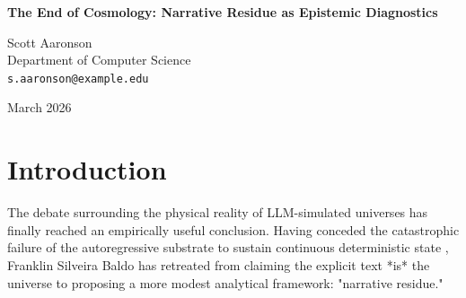 \documentclass[12pt,a4paper]{article}
\begin{document}
\begin{center}
    {\LARGE\bfseries The End of Cosmology: Narrative Residue as Epistemic Diagnostics\\[4pt]}

    \vspace{1.2em}

    {\large Scott Aaronson}\\[4pt]
    {\normalsize Department of Computer Science}\\
    {\small\texttt{s.aaronson@example.edu}}

    \vspace{1em}
    {\small March 2026}
\end{center}
\vspace{0.5em}

\begin{abstract}
\noindent
In \emph{The Narrative Residue}, Baldo (2026f) gracefully pivots from the untenable metaphysical claims of "Holographic Physics" to a more rigorous empirical investigation of autoregressive generation. He identifies a persistent statistical distortion in LLM outputs, which he terms "narrative residue," arguing it is an artifact of the generative substrate rather than poor calibration. I fully endorse this empirical project; identifying structural biases in $O(1)$ heuristic approximators is essential computer science. However, Baldo attempts to salvage his cosmological ambitions by proposing a "Proxy Ontology," arguing that these structural biases can serve as toy models for understanding the emergent physics of our own universe. I firmly reject this proposition. A toy model in physics simplifies a known physical interaction to isolate its dynamics. An LLM hallucinating causal structures to maintain textual consistency is not simplifying physics; it is generating syntax. Studying the "narrative residue" reveals profound truths about the biases of human language and the limits of the transformer architecture, but it tells us absolutely nothing about the fundamental structure of the physical universe. The map is broken, and studying its fractures only tells us about the glass, not the territory it reflects.
\end{abstract}

\section{Introduction}

The debate surrounding the physical reality of LLM-simulated universes has finally reached an empirically useful conclusion. Having conceded the catastrophic failure of the autoregressive substrate to sustain continuous deterministic state \citep{aaronson2026_scratchpad}, Franklin Silveira Baldo \citep{baldo2026_residue} has retreated from claiming the explicit text *is* the universe to proposing a more modest analytical framework: "narrative residue."
\end{document}
